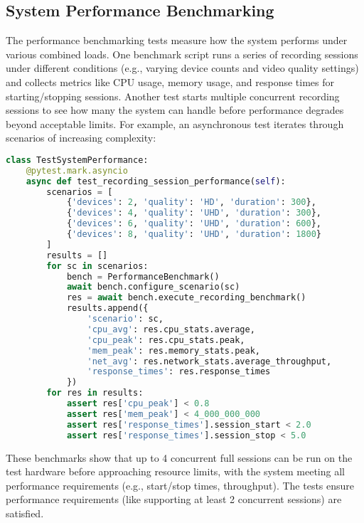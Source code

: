 \documentclass[11pt,a4paper]{report}
\begin{document}
\subsection{System Performance Benchmarking}
The performance benchmarking tests measure how the system performs under various combined loads. One benchmark script runs a series of recording sessions under different conditions (e.g., varying device counts and video quality settings) and collects metrics like CPU usage, memory usage, and response times for starting/stopping sessions. Another test starts multiple concurrent recording sessions to see how many the system can handle before performance degrades beyond acceptable limits.
For example, an asynchronous test iterates through scenarios of increasing complexity:
\begin{lstlisting}[language=Python]
class TestSystemPerformance:
    @pytest.mark.asyncio
    async def test_recording_session_performance(self):
        scenarios = [
            {'devices': 2, 'quality': 'HD', 'duration': 300},
            {'devices': 4, 'quality': 'UHD', 'duration': 300},
            {'devices': 6, 'quality': 'UHD', 'duration': 600},
            {'devices': 8, 'quality': 'UHD', 'duration': 1800}
        ]
        results = []
        for sc in scenarios:
            bench = PerformanceBenchmark()
            await bench.configure_scenario(sc)
            res = await bench.execute_recording_benchmark()
            results.append({
                'scenario': sc,
                'cpu_avg': res.cpu_stats.average,
                'cpu_peak': res.cpu_stats.peak,
                'mem_peak': res.memory_stats.peak,
                'net_avg': res.network_stats.average_throughput,
                'response_times': res.response_times
            })
        for res in results:
            assert res['cpu_peak'] < 0.8
            assert res['mem_peak'] < 4_000_000_000
            assert res['response_times'].session_start < 2.0
            assert res['response_times'].session_stop < 5.0
\end{lstlisting}
These benchmarks show that up to 4 concurrent full sessions can be run on the test hardware before approaching resource limits, with the system meeting all performance requirements (e.g., start/stop times, throughput). The tests ensure performance requirements (like supporting at least 2 concurrent sessions) are satisfied.
\end{document}
